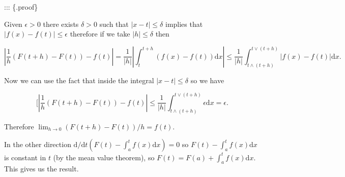 \documentclass[
]{book}
\theoremstyle{definition}
\theoremstyle{definition}
\theoremstyle{definition}
\theoremstyle{definition}
\theoremstyle{remark}
\begin{document}
::: \{.proof\}

Given \(\epsilon >0\) there exists \(\delta >0\) such that \(|x-t| \leq \delta\) implies that \(|f(x) -f(t)| \leq \epsilon\) therefore if we take \(|h| \leq \delta\) then

\[ \left| \frac{1}{h}(F(t+h) - F(t)) - f(t)\right| = \frac{1}{|h|} \left|\int_t^{t+h}(f(x) - f(t)) \mathrm{d}x\right| \leq \frac{1}{|h|} \int_{t \wedge (t+h)}^{t \vee (t+h)} |f(x) - f(t)| \mathrm{d}x. \]

Now we can use the fact that inside the integral \(|x-t| \leq \delta\) so we have

\[ [\left| \frac{1}{h}(F(t+h) - F(t)) - f(t)\right| \leq \frac{1}{|h|} \int_{t \wedge (t+h)}^{t \vee (t+h)} \epsilon \mathrm{d}x = \epsilon. \]

Therefore \(\lim_{h \rightarrow 0} (F(t+h)-F(t))/h = f(t)\).

In the other direction \(\mathrm{d}/\mathrm{d}t(F(t) - \int_a^t f(x) \mathrm{d}x) = 0\) so \(F(t) - \int_a^t f(x) \mathrm{d}x\) is constant in \(t\) (by the mean value theorem), so \(F(t) = F(a) + \int_a^t f(x) \mathrm{d}x\). This gives us the result.
\end{document}
